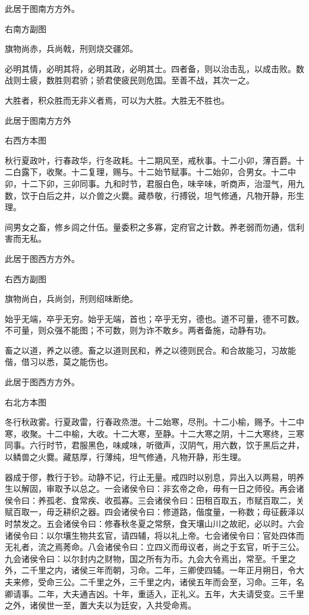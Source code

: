 \documentclass[]{article}
\begin{document}
此居于图南方方外。

右南方副图

旗物尚赤，兵尚戟，刑则烧交疆郊。

必明其情，必明其将，必明其政，必明其士。四者备，则以治击乱，以成击败。数战则士疲，数胜则君骄；骄君使疲民则危国。至善不战，其次一之。

大胜者，积众胜而无非义者焉，可以为大胜。大胜无不胜也。

此居于图南方方外

右西方本图

秋行夏政叶，行春政华，行冬政耗。十二期风至，戒秋事。十二小卯，薄百爵。十二白露下，收聚。十二复理，赐与。十二始节赋事。十二始卯，合男女。十二中卯，十二下卯，三卯同事。九和时节，君服白色，味辛味，听商声，治湿气，用九数，饮于白后之井，以介兽之火爨。藏恭敬，行搏锐，坦气修通，凡物开静，形生理。

间男女之畜，修乡闾之什伍。量委积之多寡，定府官之计数。养老弱而勿通，信利害而无私。

此居于图西方方外。

右西方副图

旗物尚白，兵尚剑，刑则绍味断绝。

始乎无端，卒乎无穷。始乎无端，首也；卒乎无穷，德也。道不可量，德不可数。不可量，则众强不能图；不可数，则为诈不敢乡。两者备施，动静有功。

畜之以道，养之以德。畜之以道则民和，养之以德则民合。和合故能习，习故能偕，借习以悉，莫之能伤也。

此居于图西方方外。

右北方本图

冬行秋政雾。行夏政雷，行春政烝泄。十二始寒，尽刑。十二小榆，赐予。十二中寒，收聚。十二中榆，大收。十二大寒，至静。十二大寒之阴，十二大寒终，三寒同事。六行时节，君服黑色，味咸味，听徵声，汉阴气，用六数，饮于黑后之井，以鳞兽之火爨。藏慈厚，行薄纯，坦气修通，凡物开静，形生理。

器成于僇，教行于钞。动静不记，行止无量。戒四时以别息，异出入以两易，明养生以解固，审取予以总之。一会诸侯令曰：非玄帝之命，毋有一日之师役。再会诸侯令曰：养孤老、食常疾、收孤寡。三会诸侯令曰：田租百取五，市赋百取二，关赋百取一，毋乏耕织之器。四会诸侯令曰：修道路，偕度量，一称数；毋征薮泽以时禁发之。五会诸侯令曰：修春秋冬夏之常祭，食天壤山川之故祀，必以时。六会诸侯令曰：以尔壤生物共玄官，请四辅，将以礼上帝。七会诸侯令曰：官处四体而无礼者，流之焉莠命。八会诸侯令曰：立四义而毋议者，尚之于玄官，听于三公。九会诸侯令曰：以尔封内之财物，国之所有为币。九会大令焉出，常至。千里之外，二千里之内，诸侯三年而朝，习命。二年，三卿使四辅。一年正月朔日，令大夫来修，受命三公。二千里之外，三千里之内，诸侯五年而会至，习命。三年，名卿请事。二年，大夫通吉凶。十年，重适入，正礼义。五年，大夫请受变。三千里之外，诸侯世一至，置大夫以为廷安，入共受命焉。
\end{document}
